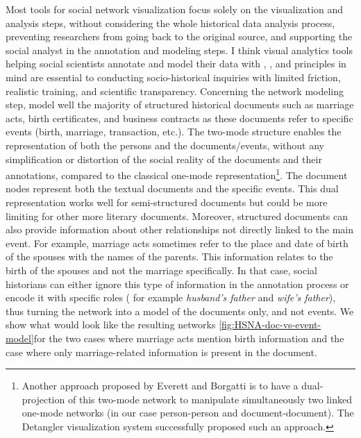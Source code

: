 Most tools for social network visualization focus solely on the visualization and analysis steps, without considering the whole historical data analysis process, preventing researchers from going back to the original source, and supporting the social analyst in the annotation and modeling steps.
I think visual analytics tools helping social scientists annotate and model their data with \reality, \traceability, and \simplicity principles in mind are essential to conducting socio-historical inquiries with limited friction, realistic training, and scientific transparency.
Concerning the network modeling step, \modelplural model well the majority of structured historical documents such as marriage acts, birth certificates, and business contracts as these documents refer to specific events (birth, marriage, transaction, etc.).
The two-mode structure enables the representation of both the persons and the documents/events, without any simplification or distortion of the social reality of the documents and their annotations, compared to the classical one-mode representation\footnote{Another approach proposed by Everett and Borgatti is to have a dual-projection of this two-mode network to manipulate simultaneously two linked one-mode networks\cite{everettDualprojectionApproachTwomode2013} (in our case person-person and document-document). The Detangler visualization system successfully proposed such an approach\cite{renoustDetanglerVisualAnalytics2015}.}.
The document nodes represent both the textual documents and the specific events.
This dual representation works well for semi-structured documents but could be more limiting for other more literary documents.
Moreover, structured documents can also provide information about other relationships not directly linked to the main event.
For example, marriage acts sometimes refer to the place and date of birth of the spouses with the names of the parents.
This information relates to the birth of the spouses and not the marriage specifically.
In that case, social historians can either ignore this type of information in the annotation process or encode it with specific roles ( for example \textit{husband's father} and \textit{wife's father}), thus turning the network into a model of the documents only, and not events.
We show what would look like the resulting networks \autoref{fig:HSNA-doc-vs-event-model}for the two cases where marriage acts mention birth information and the case where only marriage-related information is present in the document.

